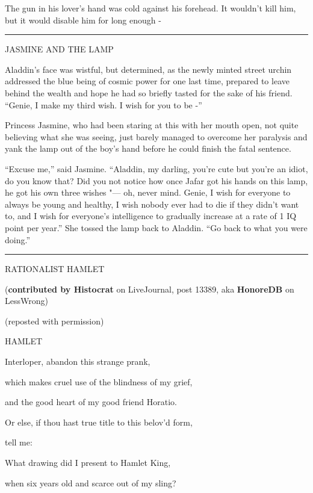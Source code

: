 The gun in his lover's hand was cold against his forehead. It wouldn't
kill him, but it would disable him for long enough -

\begin{center}\rule{3in}{0.4pt}\end{center}

JASMINE AND THE LAMP

Aladdin's face was wistful, but determined, as the newly minted street
urchin addressed the blue being of cosmic power for one last time,
prepared to leave behind the wealth and hope he had so briefly tasted
for the sake of his friend. ``Genie, I make my third wish. I wish for
you to be -''

Princess Jasmine, who had been staring at this with her mouth open, not
quite believing what she was seeing, just barely managed to overcome her
paralysis and yank the lamp out of the boy's hand before he could finish
the fatal sentence.

``Excuse me,'' said Jasmine. ``Aladdin, my darling, you're cute but
you're an idiot, do you know that? Did you not notice how once Jafar got
his hands on this lamp, he got his own three wishes "--- oh, never mind.
Genie, I wish for everyone to always be young and healthy, I wish nobody
ever had to die if they didn't want to, and I wish for everyone's
intelligence to gradually increase at a rate of 1 IQ point per year.''
She tossed the lamp back to Aladdin. ``Go back to what you were doing.''

\begin{center}\rule{3in}{0.4pt}\end{center}

RATIONALIST HAMLET

(\textbf{contributed by Histocrat} on LiveJournal, post 13389, aka
\textbf{HonoreDB} on LessWrong)

(reposted with permission)

HAMLET

Interloper, abandon this strange prank,

which makes cruel use of the blindness of my grief,

and the good heart of my good friend Horatio.

Or else, if thou hast true title to this belov'd form,

tell me:

What drawing did I present to Hamlet King,

when six years old and scarce out of my sling?

